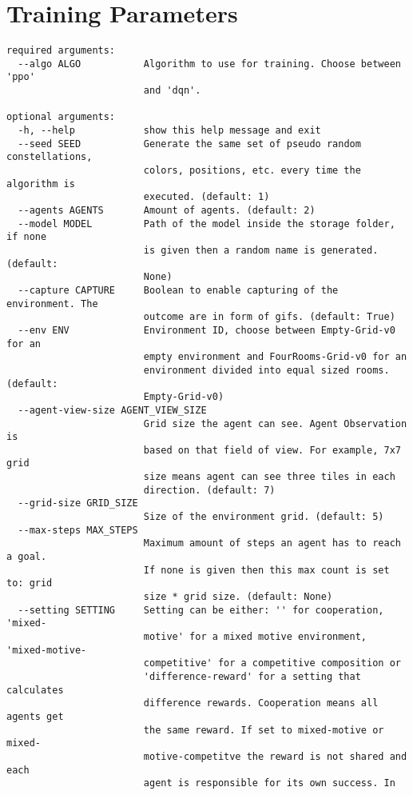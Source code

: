 \chapter{Training Parameters}\label{ax:training_params}
\small{
    \begin{verbatim}
required arguments:
  --algo ALGO           Algorithm to use for training. Choose between 'ppo'
                        and 'dqn'.

optional arguments:
  -h, --help            show this help message and exit
  --seed SEED           Generate the same set of pseudo random constellations,
                        colors, positions, etc. every time the algorithm is
                        executed. (default: 1)
  --agents AGENTS       Amount of agents. (default: 2)
  --model MODEL         Path of the model inside the storage folder, if none
                        is given then a random name is generated. (default:
                        None)
  --capture CAPTURE     Boolean to enable capturing of the environment. The
                        outcome are in form of gifs. (default: True)
  --env ENV             Environment ID, choose between Empty-Grid-v0 for an
                        empty environment and FourRooms-Grid-v0 for an
                        environment divided into equal sized rooms. (default:
                        Empty-Grid-v0)
  --agent-view-size AGENT_VIEW_SIZE
                        Grid size the agent can see. Agent Observation is
                        based on that field of view. For example, 7x7 grid
                        size means agent can see three tiles in each
                        direction. (default: 7)
  --grid-size GRID_SIZE
                        Size of the environment grid. (default: 5)
  --max-steps MAX_STEPS
                        Maximum amount of steps an agent has to reach a goal.
                        If none is given then this max count is set to: grid
                        size * grid size. (default: None)
  --setting SETTING     Setting can be either: '' for cooperation, 'mixed-
                        motive' for a mixed motive environment, 'mixed-motive-
                        competitive' for a competitive composition or
                        'difference-reward' for a setting that calculates
                        difference rewards. Cooperation means all agents get
                        the same reward. If set to mixed-motive or mixed-
                        motive-competitve the reward is not shared and each
                        agent is responsible for its own success. In

\end{verbatim}}
